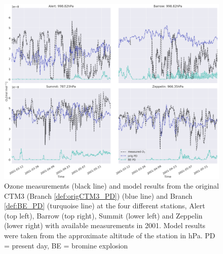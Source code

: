 \begin{figure}
    \centering
    \includegraphics[width = \linewidth]{Chapter6_Results/images/ozone_stationComp_2001/ozone_2001_compObsOrigBE.png}
    \caption{Ozone measurements (black line) and model results from the original CTM3 (Branch \ref{def:origCTM3_PD}) (blue line) and Branch \ref{def:BE_PD} (turquoise line) at the four different stations, Alert (top left), Barrow (top right), Summit (lower left) and Zeppelin (lower right) with available measurements in 2001. Model results were taken from the approximate altitude of the station in hPa. PD = present day, BE = bromine explosion}
    \label{fig:CompObsOrigBE}
\end{figure}